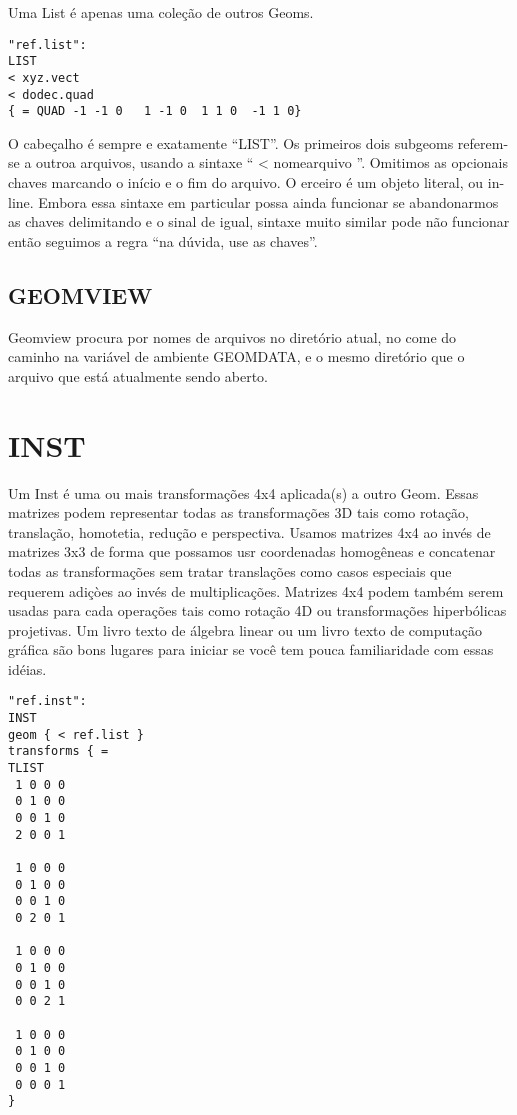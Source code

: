 \documentclass[12pt,a4paper]{book}
\begin{document}
Uma List é apenas uma coleção de outros Geoms.

\begin{verbatim}
"ref.list":
LIST
< xyz.vect
< dodec.quad
{ = QUAD -1 -1 0   1 -1 0  1 1 0  -1 1 0}
\end{verbatim}

O cabeçalho é sempre e exatamente ``LIST''. Os primeiros dois subgeoms referem-se a
outroa arquivos, usando a sintaxe `` < nomearquivo ''. Omitimos as
opcionais chaves marcando o início e o fim do arquivo.  O erceiro é um objeto literal,
ou in-line. Embora essa sintaxe em particular possa ainda funcionar se abandonarmos
as chaves delimitando e o sinal de igual, sintaxe muito similar pode
não funcionar então seguimos a regra ``na dúvida, use as chaves''.

\section{GEOMVIEW}
Geomview procura por nomes de arquivos no diretório atual, no come do caminho na
variável de ambiente GEOMDATA, e o mesmo diretório que o arquivo
que está atualmente sendo aberto. 

\chapter{INST}

Um Inst é uma ou mais transformações 4x4 aplicada(s) a outro Geom.  Essas
matrizes podem representar todas as transformações 3D tais como rotação,
translação, homotetia, redução e perspectiva.  Usamos matrizes 4x4
ao invés de matrizes 3x3 de forma que possamos usr coordenadas homogêneas e
concatenar todas as transformações sem tratar translações como
casos especiais que requerem adiçòes ao invés de multiplicações.  Matrizes
4x4 podem também serem usadas para cada operações tais como rotação 4D ou
transformações hiperbólicas projetivas. Um livro texto de álgebra linear ou um livro texto de
computação gráfica são bons lugares para iniciar se você tem pouca familiaridade com
essas idéias.
\begin{verbatim}
"ref.inst":
INST
geom { < ref.list }
transforms { = 
TLIST
 1 0 0 0
 0 1 0 0
 0 0 1 0
 2 0 0 1

 1 0 0 0
 0 1 0 0
 0 0 1 0
 0 2 0 1

 1 0 0 0
 0 1 0 0
 0 0 1 0
 0 0 2 1

 1 0 0 0
 0 1 0 0
 0 0 1 0
 0 0 0 1
}
\end{verbatim}
\end{document}
